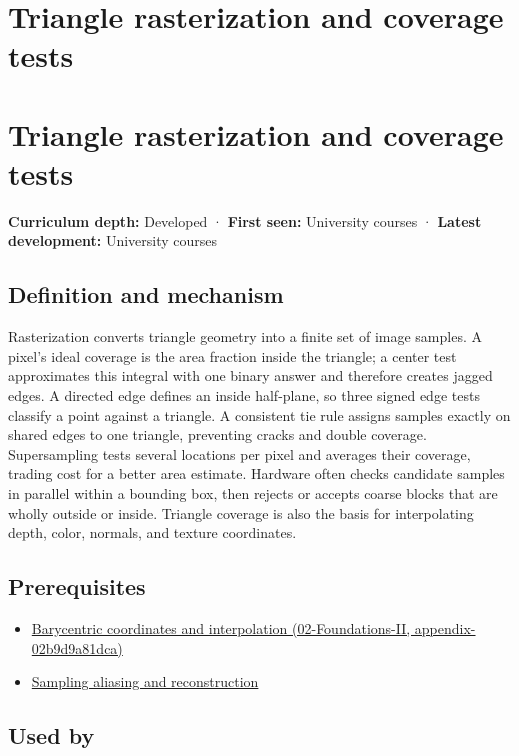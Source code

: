\hypertarget{appendix-ed3f9bc298fe}{}
\section*{Triangle rasterization and coverage tests}
\section{Triangle rasterization and coverage tests}\label{triangle-rasterization-and-coverage-tests}

\textbf{Curriculum depth:} Developed · \textbf{First seen:} University courses · \textbf{Latest development:} University courses

\subsection{Definition and mechanism}\label{definition-and-mechanism}

Rasterization converts triangle geometry into a finite set of image samples. A pixel's ideal coverage is the area fraction inside the triangle; a center test approximates this integral with one binary answer and therefore creates jagged edges. A directed edge defines an inside half-plane, so three signed edge tests classify a point against a triangle. A consistent tie rule assigns samples exactly on shared edges to one triangle, preventing cracks and double coverage. Supersampling tests several locations per pixel and averages their coverage, trading cost for a better area estimate. Hardware often checks candidate samples in parallel within a bounding box, then rejects or accepts coarse blocks that are wholly outside or inside. Triangle coverage is also the basis for interpolating depth, color, normals, and texture coordinates.

\subsection{Prerequisites}\label{prerequisites}

\begin{itemize}
\tightlist
\item
  \href{}{Barycentric coordinates and interpolation (02-Foundations-II, appendix-02b9d9a81dca)}
\item
  \hyperref[appendix-6a7869dd79a6]{Sampling aliasing and reconstruction}
\end{itemize}

\subsection{Used by}\label{used-by}

